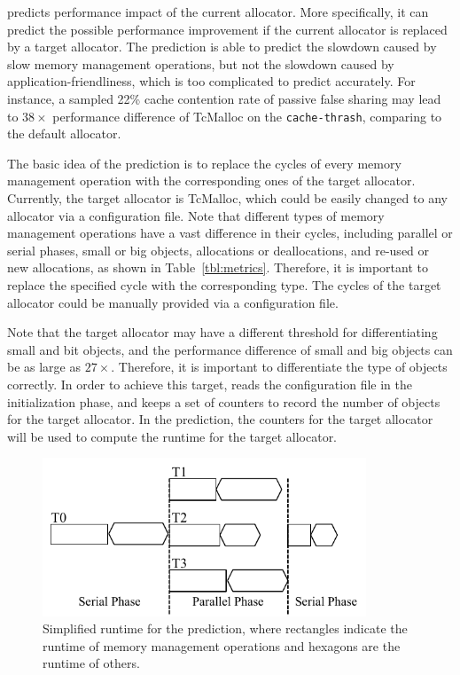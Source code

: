 \label{sec:predict}

\MP{} predicts performance impact of the current allocator. More specifically, it can predict the possible performance improvement if the current allocator is replaced by a target allocator. The prediction is able to predict the slowdown caused by slow memory management operations, but not the slowdown caused by application-friendliness, which is too complicated to predict accurately. For instance, a sampled 22\% cache contention rate of passive false sharing may lead to $38\times$ performance difference of TcMalloc on the \texttt{cache-thrash}, comparing to the default allocator. 

The basic idea of the prediction is to replace the cycles of every memory management operation with the corresponding ones of the target allocator. Currently, the target allocator is TcMalloc, which could be easily changed to any allocator via a configuration file. Note that different types of memory management operations have a vast difference in their cycles, including parallel or serial phases, small or big objects, allocations or deallocations, and re-used or new allocations, as shown in Table~\ref{tbl:metrics}. Therefore, it is important to replace the specified cycle with the corresponding type. The cycles of the target allocator could be manually provided via a configuration file. 

Note that the target allocator may have a different threshold for differentiating small and bit objects, and the performance difference of small and big objects can be as large as $27\times$. Therefore, it is important to differentiate the type of objects correctly. In order to achieve this target, \MP{} reads the configuration file in the initialization phase, and keeps a set of counters to record the number of objects for the target allocator. In the prediction, the counters for the target allocator will be used to compute the runtime for the target allocator. 

 



\begin{figure}[htbp]
\centering
\includegraphics[width=3.8in]{figures/forkjoin}
\caption{Simplified runtime for the prediction, where rectangles indicate the runtime of memory management operations and hexagons are the runtime of others. \label{fig:time}}
\end{figure}

